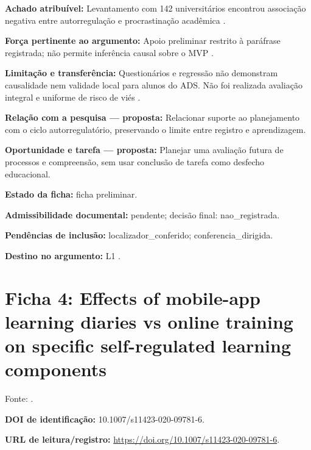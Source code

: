 \noindent\textbf{Achado atribuível:} Levantamento com 142 universitários encontrou associação negativa entre autorregulação e procrastinação acadêmica \citep{education_brahma2023}.\par\medskip

\noindent\textbf{Força pertinente ao argumento:} Apoio preliminar restrito à paráfrase registrada; não permite inferência causal sobre o MVP \citep{education_brahma2023}.\par\medskip

\noindent\textbf{Limitação e transferência:} Questionários e regressão não demonstram causalidade nem validade local para alunos do ADS. Não foi realizada avaliação integral e uniforme de risco de viés \citep{education_brahma2023}.\par\medskip

\noindent\textbf{Relação com a pesquisa — proposta:} Relacionar suporte ao planejamento com o ciclo autorregulatório, preservando o limite entre registro e aprendizagem.\par\medskip

\noindent\textbf{Oportunidade e tarefa — proposta:} Planejar uma avaliação futura de processos e compreensão, sem usar conclusão de tarefa como desfecho educacional.\par\medskip

\noindent\textbf{Estado da ficha:} ficha preliminar.\par\medskip

\noindent\textbf{Admissibilidade documental:} pendente; decisão final: nao\_registrada.\par\medskip

\noindent\textbf{Pendências de inclusão:} localizador\_conferido; conferencia\_dirigida.\par\medskip

\noindent\textbf{Destino no argumento:} L1 .

\clearpage\section*{Ficha 4: Effects of mobile-app learning diaries vs online training on specific self-regulated learning components}

Fonte: \citet{education_broadbent2020}.

\noindent\textbf{DOI de identificação:} 10.1007/s11423-020-09781-6.\par\medskip

\noindent\textbf{URL de leitura/registro:} \url{https://doi.org/10.1007/s11423-020-09781-6}.\par\medskip

